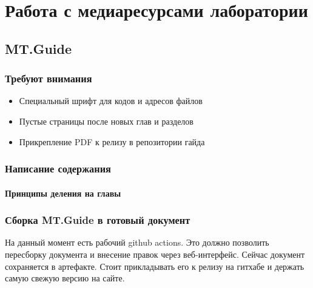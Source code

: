 \part[Медиаресурсы лаборатории]{Работа с медиаресурсами лаборатории}
\chapter[MT.Guide]{MT.Guide}
\section[Issues]{Требуют внимания}
\begin{itemize}
    \item Специальный шрифт для кодов и адресов файлов
    \item Пустые страницы после новых глав и разделов
    \item Прикрепление PDF к релизу в репозитории гайда
\end{itemize}
\section[Руководство для авторов]{Написание содержания}
\subsection[Деление на главы]{Принципы деления на главы}

\section[Сборка и публикация]{Сборка MT.Guide в готовый документ}
На данный момент есть рабочий github actions. Это должно позволить пересборку документа и внесение правок через веб-интерфейс. Сейчас документ сохраняется в артефакте. Стоит прикладывать его к релизу на гитхабе и держать самую свежую версию на сайте.
